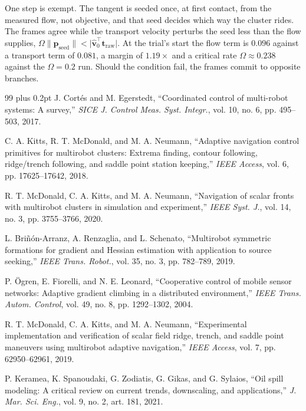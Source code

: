 \documentclass[lettersize,journal]{IEEEtran}
\begin{document}
One step is exempt. The tangent is seeded once, at first contact, from
the measured flow, not objective, and that seed decides which
way the cluster rides. The frames agree while the transport
velocity perturbs the seed less than the flow supplies,
$\Omega\lVert\mathbf{p}_{\text{seed}}\rVert <
\lvert\hat{\mathbf{v}}_0^\top\mathbf{t}_{\text{raw}}\rvert$.
At the trial's start the flow term is $0.096$ against a transport term
of $0.081$, a margin of $1.19\times$ and a critical rate
$\Omega \approx 0.238$ against the $\Omega = 0.2$ run. Should the
condition fail, the frames commit to opposite branches.

\begin{thebibliography}{99}
\small
\itemsep 0pt plus 0.2pt
\parskip 0pt
 J. Cortés and M. Egerstedt, ``Coordinated control of multi-robot
systems: A survey,'' \textit{SICE J. Control Meas. Syst. Integr.},
vol. 10, no. 6, pp. 495--503, 2017.

 C. A. Kitts, R. T. McDonald, and M. A. Neumann, ``Adaptive
navigation control primitives for multirobot clusters: Extrema finding,
contour following, ridge/trench following, and saddle point station keeping,''
\textit{IEEE Access}, vol. 6, pp. 17625--17642, 2018.

 R. T. McDonald, C. A. Kitts, and M. A. Neumann, ``Navigation of
scalar fronts with multirobot clusters in simulation and experiment,''
\textit{IEEE Syst. J.}, vol. 14, no. 3, pp. 3755--3766, 2020.

 L. Briñón-Arranz, A. Renzaglia, and L. Schenato, ``Multirobot
symmetric formations for gradient and Hessian estimation with application to
source seeking,'' \textit{IEEE Trans. Robot.}, vol. 35, no. 3,
pp. 782--789, 2019.

 P. Ögren, E. Fiorelli, and N. E. Leonard, ``Cooperative control
of mobile sensor networks: Adaptive gradient climbing in a distributed
environment,'' \textit{IEEE Trans. Autom. Control}, vol. 49, no. 8,
pp. 1292--1302, 2004.

 R. T. McDonald, C. A. Kitts, and M. A. Neumann, ``Experimental
implementation and verification of scalar field ridge, trench, and saddle
point maneuvers using multirobot adaptive navigation,'' \textit{IEEE Access},
vol. 7, pp. 62950--62961, 2019.

 P. Keramea, K. Spanoudaki, G. Zodiatis, G. Gikas, and
G. Sylaios, ``Oil spill modeling: A critical review on current trends,
downscaling, and applications,'' \textit{J. Mar. Sci. Eng.}, vol. 9,
no. 2, art. 181, 2021.


\end{thebibliography}
\end{document}
